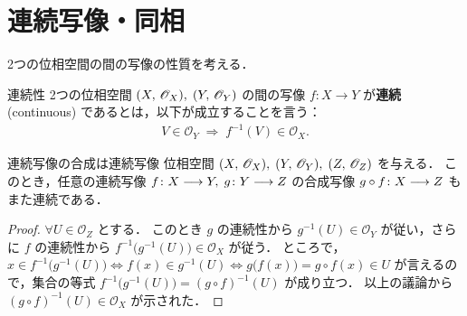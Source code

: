 \documentclass[geometry_main]{subfiles}
\begin{document}
\section{連続写像・同相}

2つの位相空間の間の写像の性質を考える．

\begin{mydef}[label=def.continuous]{連続性}
	2つの位相空間 $(X,\, \mathscr{O}_{X}),\; (Y,\, \mathscr{O}_{Y})$ の間の写像 $f\colon X \to Y$ が\textbf{連続} (continuous) であるとは，以下が成立することを言う：
	\begin{align}
		V \in \mathscr{O}_Y \; \Longrightarrow \; f^{-1}(V) \in \mathscr{O}_X.
	\end{align}
\end{mydef}

\begin{myprop}[label=prop:cont-composite]{連続写像の合成は連続写像}
	位相空間 $(X,\, \mathscr{O}_{X}),\; (Y,\, \mathscr{O}_{Y}),\; (Z,\, \mathscr{O}_{Z})$ を与える．
	このとき，任意の連続写像 $f \colon X \longrightarrow Y,\; g \colon Y \longrightarrow Z$ の合成写像 $g \circ f \colon X \longrightarrow Z$ もまた連続である．
\end{myprop}

\begin{proof}
	$\forall U \in \mathscr{O}_Z$ とする．
	このとき $g$ の連続性から $g^{-1}(U) \in \mathscr{O}_Y$ が従い，さらに $f$ の連続性から $f^{-1} \bigl( g^{-1}(U) \bigr) \in \mathscr{O}_X$ が従う．
	ところで，$x \in f^{-1} \bigl( g^{-1}(U) \bigr) \iff f(x) \in g^{-1}(U) \iff g \bigl( f(x) \bigr) = g \circ f(x) \in U$ が言えるので，集合の等式 $f^{-1} \bigl( g^{-1}(U) \bigr) = (g\circ f)^{-1}(U)$ が成り立つ．
	以上の議論から $(g\circ f)^{-1}(U) \in \mathscr{O}_X$ が示された．
\end{proof}
\end{document}
